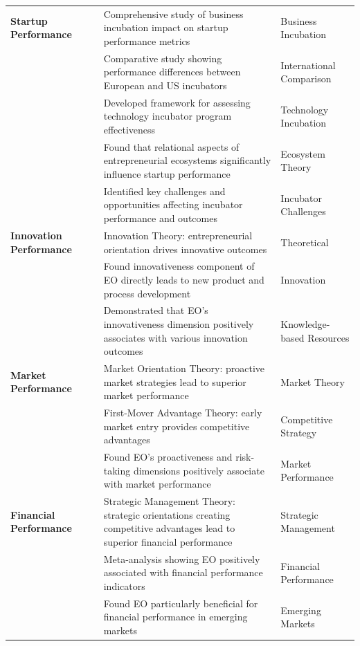 \documentclass[../Main.tex]{subfiles}
\begin{document}
\begin{longtable}{|p{2.5cm}|p{3cm}|p{6cm}|p{2.5cm}|}
        \textbf{Startup Performance} & \autocite{patton2014realising} & Comprehensive study of business incubation impact on startup performance metrics & Business Incubation \\
        & \autocite{barbero2012revisiting} & Comparative study showing performance differences between European and US incubators & International Comparison \\
        & \autocite{Chan2005Assessing} & Developed framework for assessing technology incubator program effectiveness & Technology Incubation \\
        & \autocite{spigel2017relational} & Found that relational aspects of entrepreneurial ecosystems significantly influence startup performance & Ecosystem Theory \\
        & \autocite{al2017challenges} & Identified key challenges and opportunities affecting incubator performance and outcomes & Incubator Challenges \\
        \hline
        
        \textbf{Innovation Performance} & \autocite{schumpeter1934theory} & Innovation Theory: entrepreneurial orientation drives innovative outcomes & Theoretical \\
        & \autocite{lumpkin1996clarifying} & Found innovativeness component of EO directly leads to new product and process development & Innovation \\
        & \autocite{wiklund2003knowledge} & Demonstrated that EO's innovativeness dimension positively associates with various innovation outcomes & Knowledge-based Resources \\
        \hline
        
        \textbf{Market Performance} & \autocite{narver1990effect} & Market Orientation Theory: proactive market strategies lead to superior market performance & Market Theory \\
        & \autocite{lieberman1988first} & First-Mover Advantage Theory: early market entry provides competitive advantages & Competitive Strategy \\
        & \autocite{lumpkin2001linking} & Found EO's proactiveness and risk-taking dimensions positively associate with market performance & Market Performance \\
        \hline
        
        \textbf{Financial Performance} & \autocite{porter1980competitive} & Strategic Management Theory: strategic orientations creating competitive advantages lead to superior financial performance & Strategic Management \\
        & \autocite{rauch2009entrepreneurial} & Meta-analysis showing EO positively associated with financial performance indicators & Financial Performance \\
        & \autocite{saeed2014entrepreneurial} & Found EO particularly beneficial for financial performance in emerging markets & Emerging Markets \\
        \hline
    \end{longtable}
\end{document}
